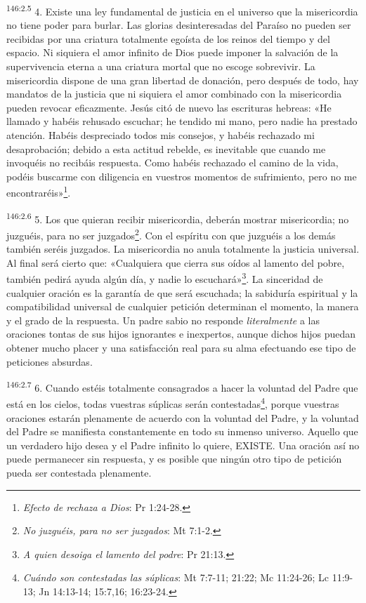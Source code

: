 \par
\textsuperscript{146:2.5} 4. Existe una ley fundamental de justicia en el universo que la misericordia no tiene poder para burlar. Las glorias desinteresadas del Paraíso no pueden ser recibidas por una criatura totalmente egoísta de los reinos del tiempo y del espacio. Ni siquiera el amor infinito de Dios puede imponer la salvación de la supervivencia eterna a una criatura mortal que no escoge sobrevivir. La misericordia dispone de una gran libertad de donación, pero después de todo, hay mandatos de la justicia que ni siquiera el amor combinado con la misericordia pueden revocar eficazmente. Jesús citó de nuevo las escrituras hebreas: «He llamado y habéis rehusado escuchar; he tendido mi mano, pero nadie ha prestado atención. Habéis despreciado todos mis consejos, y habéis rechazado mi desaprobación; debido a esta actitud rebelde, es inevitable que cuando me invoquéis no recibáis respuesta. Como habéis rechazado el camino de la vida, podéis buscarme con diligencia en vuestros momentos de sufrimiento, pero no me encontraréis»\footnote{\textit{Efecto de rechaza a Dios}: Pr 1:24-28.}.

\par
\textsuperscript{146:2.6} 5. Los que quieran recibir misericordia, deberán mostrar misericordia; no juzguéis, para no ser juzgados\footnote{\textit{No juzguéis, para no ser juzgados}: Mt 7:1-2.}. Con el espíritu con que juzguéis a los demás también seréis juzgados. La misericordia no anula totalmente la justicia universal. Al final será cierto que: «Cualquiera que cierra sus oídos al lamento del pobre, también pedirá ayuda algún día, y nadie lo escuchará»\footnote{\textit{A quien desoiga el lamento del podre}: Pr 21:13.}. La sinceridad de cualquier oración es la garantía de que será escuchada; la sabiduría espiritual y la compatibilidad universal de cualquier petición determinan el momento, la manera y el grado de la respuesta. Un padre sabio no responde \textit{literalmente} a las oraciones tontas de sus hijos ignorantes e inexpertos, aunque dichos hijos puedan obtener mucho placer y una satisfacción real para su alma efectuando ese tipo de peticiones absurdas.

\par
\textsuperscript{146:2.7} 6. Cuando estéis totalmente consagrados a hacer la voluntad del Padre que está en los cielos, todas vuestras súplicas serán contestadas\footnote{\textit{Cuándo son contestadas las súplicas}: Mt 7:7-11; 21:22; Mc 11:24-26; Lc 11:9-13; Jn 14:13-14; 15:7,16; 16:23-24.}, porque vuestras oraciones estarán plenamente de acuerdo con la voluntad del Padre, y la voluntad del Padre se manifiesta constantemente en todo su inmenso universo. Aquello que un verdadero hijo desea y el Padre infinito lo quiere, EXISTE. Una oración así no puede permanecer sin respuesta, y es posible que ningún otro tipo de petición pueda ser contestada plenamente.


